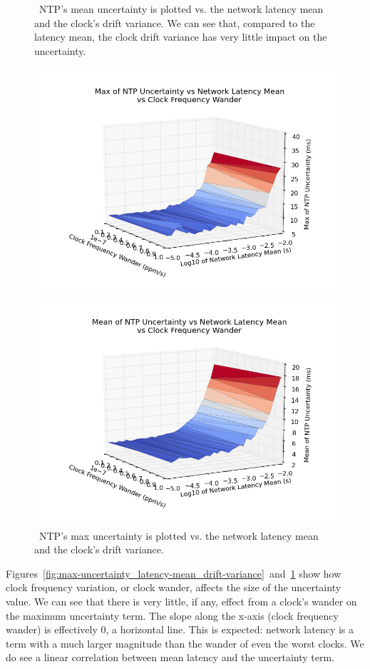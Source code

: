 \begin{figure}[!htbp]
  \caption{~NTP's mean uncertainty is plotted vs. the network latency mean and the clock's drift variance. We can see that, compared to the latency mean, the clock drift variance has very little impact on the uncertainty.}
  \label{fig:max-uncertainty_latency-mean_drift-variance}
  \includegraphics[width=0.8\linewidth]{max_max_err-mean_latency-drift_variance.png}

  \caption{~NTP's max uncertainty is plotted vs. the network latency mean and the clock's drift variance.}
  \label{fig:mean-uncertainty_latency-mean_drift-variance}
  \includegraphics[width=0.8\linewidth]{mean_max_err-mean_latency-drift_variance.png}
\end{figure}

Figures~\ref{fig:max-uncertainty_latency-mean_drift-variance}~and~\ref{fig:mean-uncertainty_latency-mean_drift-variance} show how
clock frequency variation, or clock wander, affects the size of the
uncertainty value.  We can see that there is very little, if any,
effect from a clock's wander on the maximum uncertainty term. The
slope along the x-axis (clock frequency wander) is effectively 0, a
horizontal line. This is expected: network latency is a term with a
much larger magnitude than the wander of even the worst clocks. We do
see a linear correlation between mean latency and the uncertainty term.

